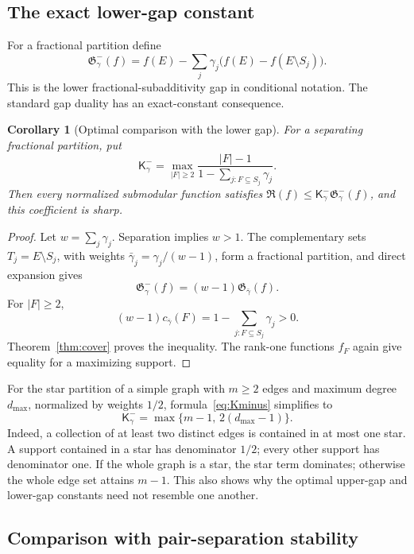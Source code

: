 \documentclass[11pt]{article}
\newtheorem{corollary}[theorem]{Corollary}
\theoremstyle{definition}
\theoremstyle{remark}
\newcommand{\1}{\mathbf 1}
\newcommand{\Red}{\mathfrak R}
\newcommand{\Gap}{\mathfrak G}
\newcommand{\Kopt}{\mathsf K}
\begin{document}
\subsection{The exact lower-gap constant}

For a fractional partition define
\[
 \Gap^-_\gamma(f)=f(E)-\sum_j\gamma_j
 \bigl(f(E)-f(E\setminus S_j)\bigr).
\]
This is the lower fractional-subadditivity gap in conditional notation.
The standard gap duality \cite{MadimanTetali} has an exact-constant consequence.

\begin{corollary}[Optimal comparison with the lower gap]
\label{cor:lower}
For a separating fractional partition, put
\begin{equation}
 \Kopt^-_\gamma=\max_{|F|\ge2}
 \frac{|F|-1}{1-\sum_{j:F\subseteq S_j}\gamma_j}.
 \label{eq:Kminus}
\end{equation}
Then every normalized submodular function satisfies
$\Red(f)\le\Kopt^-_\gamma\Gap^-_\gamma(f)$, and this coefficient is sharp.
\end{corollary}

\begin{proof}
Let $w=\sum_j\gamma_j$. Separation implies $w>1$. The complementary sets
$T_j=E\setminus S_j$, with weights $\bar\gamma_j=\gamma_j/(w-1)$, form a
fractional partition, and direct expansion gives
\[
 \Gap^-_\gamma(f)=(w-1)\Gap_{\bar\gamma}(f).
\]
For $|F|\ge2$,
\[
 (w-1)c_{\bar\gamma}(F)
 =1-\sum_{j:F\subseteq S_j}\gamma_j>0.
\]
Theorem~\ref{thm:cover} proves the inequality. The rank-one functions $f_F$
again give equality for a maximizing support.
\end{proof}

For the star partition of a simple graph with $m\ge2$ edges and maximum degree
$d_{\max}$, normalized by weights $1/2$, formula~\eqref{eq:Kminus} simplifies to
\begin{equation}
 \Kopt^-_\gamma=\max\{m-1,\,2(d_{\max}-1)\}.
 \label{eq:graphlower}
\end{equation}
Indeed, a collection of at least two distinct edges is contained in at most one
star. A support contained in a star has denominator $1/2$; every other support
has denominator one. If the whole graph is a star, the star term dominates;
otherwise the whole edge set attains $m-1$. This also shows why the optimal
upper-gap and lower-gap constants need not resemble one another.

\subsection{Comparison with pair-separation stability}
\label{sec:comparison}
\end{document}
